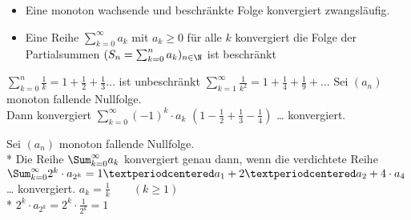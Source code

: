 %
\begin{itemize}
    \item{Eine monoton wachsende und beschränkte Folge konvergiert zwangsläufig.}
    \item{Eine Reihe $\sum_{k=0}^{∞} a_k$ mit $a_k \geq 0$ für alle $k$ konvergiert \equ die Folge der Partialsummen $(S_n = \sum_{k=0}^{n} a_k)_{n \in \N}$ ist beschränkt}
\end{itemize}
%
\bsp
    $\sum_{k=0}^{n} \frac{1}{k} = 1 + \frac{1}{2} + \frac{1}{3} …$ ist unbeschränkt
\bsp
    $\sum_{k=1}^{\infty} \frac{1}{k^2} = 1 + \frac{1}{4} + \frac{1}{9}+…$
    Sei $(a_n)$ monoton fallende Nullfolge.\\
    Dann konvergiert $\sum_{k=0}^{∞} (-1)^k \cdot a_k$
\bsp
    $(1 - \frac{1}{2} + \frac{1}{3} - \frac{1}{4})$ … konvergiert.

Sei $(a_n)$ monoton fallende Nullfolge.\\*
Die Reihe $\Sum_{k=0}^{\infty} a_k$ konvergiert genau dann, wenn die verdichtete Reihe $\Sum_{k=0}^{\infty} 2^k \cdot a_{2^k} = 1 · a_1 + 2 · a_2 + 4 \cdot a_4$ … konvergiert.
%
\bsp
    $a_k = \frac{1}{k}\qquad (k \geq 1)$\\*
    $2^k \cdot a_{2^k} = 2^k \cdot \frac{1}{2^k} = 1$

